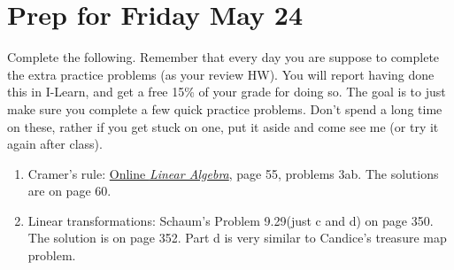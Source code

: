 \documentclass[letterpaper,oneside]{book}%
\newcommand{\onlinetext}{https://content.byui.edu/file/c2f91762-7a1e-4d0b-a1ae-8d5f5f548e17/1/341-Book.pdf}
\theoremstyle{plain}
\theoremstyle{box}
\theoremstyle{problem}
\newtheorem*{hwenum*}{Home Work Practice}
\newenvironment{hw*}[1][]{\begin{hwenum*}[#1]}{\end{hwenum*}\nopagebreak\hrule\bigskip}
\begin{document}
\section{Prep for Friday May 24}
\begin{hw*}
 Complete the following.  Remember that every day you are suppose to complete the extra practice problems (as your review HW).  You will report having done this in I-Learn, and get a free 15\% of your grade for doing so. The goal is to just make sure you complete a few quick practice problems. Don't spend a long time on these, rather if you get stuck on one, put it aside and come see me (or try it again after class). 
 \begin{enumerate}
  \item Cramer's rule: \href{\onlinetext}{Online {\it Linear Algebra}}, page 55, problems 3ab. The solutions are on page 60.
  \item Linear transformations: Schaum's Problem 9.29(just c and d) on page 350.  The solution is on page 352.  Part d is very similar to Candice's treasure map problem.
 \end{enumerate}
\end{hw*}
\end{document}
